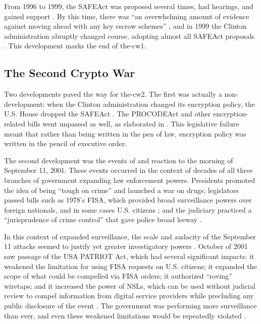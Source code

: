 From 1996 to 1999, the \ac{SAFEAct} was proposed several times, had hearings, and gained support \cite{kehl_right_2015}.
By this time, there was ``an overwhelming amount of evidence against moving ahead with any key escrow schemes''
\cite{thompson_2015}, and in 1999 the Clinton administration abruptly changed course, adopting almost all \ac{SAFEAct}
proposals \cite{kehl_right_2015}. This development marks the end of \ac{the-cw1}.

\subsection{The Second Crypto War}
\label{sec-history-cw2}

Two developments paved the way for \ac{the-cw2}. The first was actually a non-development: when the Clinton
administration changed its encryption policy, the U.S. House dropped the \ac{SAFEAct} \cite{goodlatte_hr3011_1996}. The
\ac{PROCODEAct} and other encryption-related bills went unpassed as well, as elaborated in .
This legislative failure meant that rather than being written in the pen of law, encryption policy was written in the
pencil of executive order.

The second development was the events of and reaction to the morning of September 11, 2001. These events occurred in the
context of decades of all three branches of government expanding law enforcement powers. Presidents promoted the idea of
being ``tough on crime'' and launched a war on drugs; legislators passed bills such as 1978's \ac{FISA}, which provided
broad surveillance powers over foreign nationals, and in some cases U.S. citizens \cite{rodino_1978}; and the judiciary
practiced a ``jurisprudence of crime control'' that gave police broad leeway \cite{gizzi_fourth_2016}.

In this context of expanded surveillance, the scale and audacity of the September 11 attacks seemed to justify yet
greater investigatory powers \cite{bloss_escalating_2007}. October of 2001 saw passage of the USA PATRIOT Act, which had
several significant impacts: it weakened the limitation for using \ac{FISA} requests on U.S. citizens; it expanded the
scope of what could be compelled via \ac{FISA} orders; it authorized ``roving'' wiretaps; and it increased the power of
\acp{NSL}, which can be used without judicial review to compel information from digital service providers while
precluding any public disclosure of the event \cite{sensenbrenner_2001} \cite{shamsi_2011}. The government was
performing more surveillance than ever, and even these weakened limitations would be repeatedly violated
\cite{shamsi_2011} \cite{tucker_2020}.

